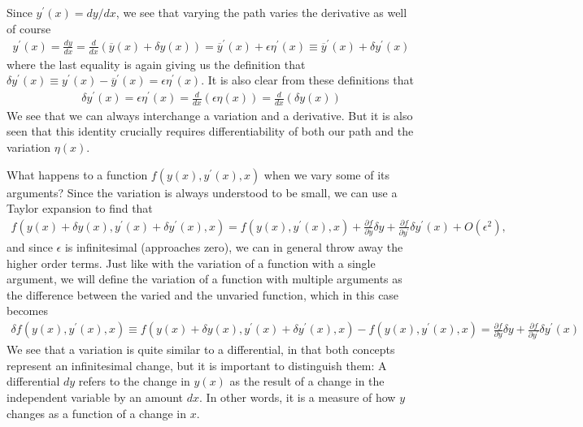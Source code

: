\documentclass[a4paper]{article}
\begin{document}
    Since \(y^{\prime} (x) = dy / dx\), we see that varying the path varies the derivative as well of course 
    \begin{align*}
        y^{\prime} (x) = \frac{dy}{dx} = \frac{d}{dx} \left( \overline{y}(x) + \delta y(x) \right) = \overline{y}^{\prime} (x) + \epsilon \eta^{\prime}(x) \equiv \overline{y}^{\prime} (x) + \delta y^{\prime} (x)
    \end{align*} 
    where the last equality is again giving us the definition that \(\delta y^{\prime} (x) \equiv y^{\prime} (x) - \overline{y}^{\prime} (x) = \epsilon \eta ^{\prime} (x)\). It is also clear from these definitions that \begin{align*}
        \delta y^{\prime} (x) = \epsilon \eta ^{\prime} (x) = \frac{d}{dx}\left( \epsilon \eta (x) \right) = \frac{d}{dx}\left( \delta y(x) \right) 
    \end{align*}
    We see that we can always interchange a variation and a derivative. But it is also seen that this identity crucially requires differentiability of both our path and the variation \(\eta(x)\). 

    What happens to a function \(f(y(x), y^{\prime}(x), x)\) when we vary some of its arguments? Since the variation is always understood to be small, we can use a Taylor expansion to find that \begin{align*}
        f(y(x) + \delta y(x), y^{\prime} (x) + \delta y^{\prime} (x), x) = f(y(x), y^{\prime} (x), x) + \frac{\partial f}{\partial y} \delta y + \frac{\partial f}{\partial y^{\prime} } \delta y^{\prime} (x) + O(\epsilon^{2}),
    \end{align*}
    and since \(\epsilon\) is infinitesimal (approaches zero), we can in general throw away the higher order terms. Just like with the variation of a function with a single argument, we will define the variation of a function with multiple arguments as the difference between the varied and the unvaried function, which in this case becomes \begin{align*}
        \delta f(y(x), y^{\prime} (x), x) \equiv f(y(x) + \delta y(x), y^{\prime} (x) + \delta y^{\prime} (x), x) - f(y(x), y^{\prime} (x), x) = \frac{\partial f}{\partial y} \delta y + \frac{\partial f}{\partial y^{\prime} } \delta y^{\prime} (x)
    \end{align*}
    We see that a variation is quite similar to a differential, in that both concepts represent an infinitesimal change, but it is important to distinguish them: A differential \(dy\) refers to the change in \(y(x)\) as the result of a change in the independent variable by an amount \(dx\). In other words, it is a measure of how \(y\) changes as a function of a change in \(x\). 
    
\end{document}
